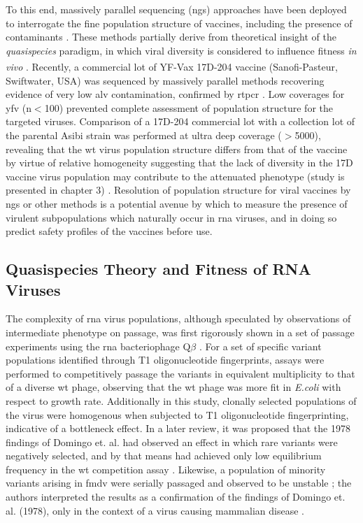 To this end, massively parallel sequencing (\gls{ngs}) approaches have been deployed to interrogate the fine population structure of vaccines, including the presence of contaminants \parencite{Neverov:2010ko}. These methods partially derive from theoretical insight of the \emph{quasispecies} paradigm, in which viral diversity is considered to influence fitness \emph{in vivo} \parencite{Andino:2015bg}. Recently, a commercial lot of YF-Vax\textsuperscript{\textregistered} 17D-204 vaccine (Sanofi-Pasteur, Swiftwater, USA) was sequenced by massively parallel methods recovering evidence of very low \gls{alv} contamination, confirmed by \gls{rtpcr}  \parencite{Victoria:2010kf}. Low coverages for \gls{yfv} (n$<$100) prevented complete assessment of population structure for the targeted viruses. Comparison of a 17D-204 commercial lot with a collection lot of the parental Asibi strain was performed at ultra deep coverage ($>$5000), revealing that the \gls{wt} virus population structure differs from that of the vaccine by virtue of relative homogeneity suggesting that the lack of diversity in the 17D vaccine virus population may contribute to the attenuated phenotype (study is presented in chapter 3)  \parencite{Beck:2014cm}. Resolution of population structure for viral vaccines by \gls{ngs} or other methods is a potential avenue by which to measure the presence of virulent subpopulations which naturally occur in \gls{rna} viruses, and in doing so predict safety profiles of the vaccines before use.

\subsection{Quasispecies Theory and Fitness of RNA Viruses}
The complexity of \gls{rna} virus populations, although speculated by observations of intermediate phenotype on passage, was first rigorously shown in a set of passage experiments using the \gls{rna} bacteriophage Q$\beta$ \parencite{Domingo:1978wg}. For a set of specific variant populations identified through T1 oligonucleotide fingerprints, assays were performed to competitively passage the variants in equivalent multiplicity to that of a diverse \gls{wt} phage, observing that the \gls{wt} phage was more fit in \emph{E.coli} with respect to growth rate. Additionally in this study, clonally selected populations of the virus were homogenous when subjected to T1 oligonucleotide fingerprinting, indicative of a bottleneck effect. In a later review, it was proposed that the 1978 findings of Domingo et. al. had observed an effect in which rare variants were negatively selected, and by that means had achieved only low equilibrium frequency in the \gls{wt} competition assay \parencite{Holland:1982kp}. Likewise, a population of minority variants arising in \gls{fmdv} were serially passaged and observed to be unstable \parencite{Sobrino:1983wn}; the authors interpreted the results as a confirmation of the findings of Domingo et. al. (1978), only in the context of a virus causing mammalian disease \parencite{Domingo:1978wg}. 

